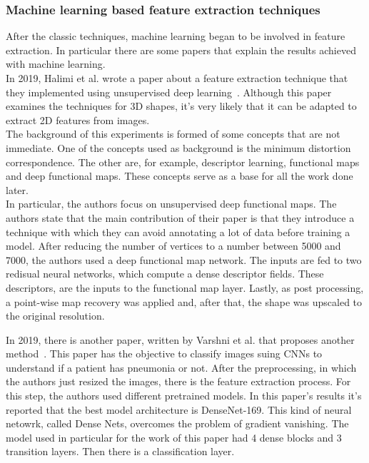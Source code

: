 \documentclass[conference]{IEEEtran}
\begin{document}
			
		\subsubsection{Machine learning based feature extraction techniques}
			
			After the classic techniques, machine learning began to be involved in feature extraction. In particular there are some papers that explain the results achieved with machine learning.\\
			In 2019, Halimi et al. wrote a paper about a feature extraction technique that they implemented using unsupervised deep learning~\cite{5}. Although this paper examines the techniques for 
			3D shapes, it's very likely that it can be adapted to extract 2D features from images.\\
			The background of this experiments is formed of some concepts that are not immediate. One of the concepts used as background is the minimum distortion correspondence. The other are, for example, 
			descriptor learning, functional maps and deep functional maps. These concepts serve as a base for all the work done later. \\
			In particular, the authors focus on unsupervised deep functional maps. The authors state that the main contribution of their paper is that they introduce a technique with which they can 
			avoid annotating a lot of data before training a model. After reducing the number of vertices to a number between 5000 and 7000, the authors used a deep functional map network. The inputs are 
			fed to two redisual neural networks, which compute a dense descriptor fields. These descriptors, are the inputs to the functional map layer. Lastly, as post processing, a point-wise map recovery was 
			applied and, after that, the shape was upscaled to the original resolution. 
			
			\noindent In 2019, there is another paper, written by Varshni et al. that proposes another method~\cite{6}. This paper has the objective to classify images suing CNNs to understand if a patient 
			has pneumonia or not. After the preprocessing, in which the authors just resized the images, there is the feature extraction process. For this step, the authors used different pretrained models.
			In this paper's results it's reported that the best model architecture is DenseNet-169. This kind of neural netowrk, called Dense Nets, overcomes the problem of gradient vanishing. The model used in 
			particular for the work of this paper had 4 dense blocks and 3 transition layers. Then there is a classification layer. 
			
\end{document}
